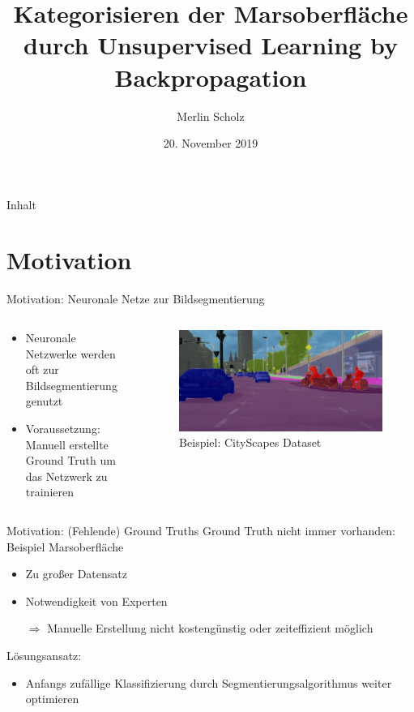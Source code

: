 \documentclass[aspectratio=169]{beamer}
\title[Analyse der Marsoberfläche durch Unsupervised Learning]{Kategorisieren der Marsoberfläche durch Unsupervised Learning by Backpropagation}
\author{Merlin Scholz}
\institute{TU Dortmund}
\date[20.11.2019]{20. November 2019}
\begin{document}
\frame{\titlepage}

\begin{frame}{Inhalt}
	\tableofcontents
\end{frame}

\section{Motivation}

\begin{frame}{Motivation: Neuronale Netze zur Bildsegmentierung}
\begin{columns}
	\begin{column}{.5\textwidth}
		\begin{itemize}
			\item Neuronale Netzwerke werden oft zur Bildsegmentierung genutzt
			\item Voraussetzung: Manuell erstellte Ground Truth um das Netzwerk zu trainieren
			\end{itemize}
	\end{column}
	\begin{column}{.5\textwidth}
		\begin{figure}[H]
			\includegraphics[width=\textwidth,keepaspectratio]{koeln00.png}
			\caption{Beispiel: CityScapes Dataset\cite{Cordts_2016_CVPR}}
		\end{figure}
	\end{column}
\end{columns}


\end{frame}

\begin{frame}{Motivation: (Fehlende) Ground Truths}
Ground Truth nicht immer vorhanden: Beispiel Marsoberfläche
\begin{itemize}
	\item Zu großer Datensatz
	\item Notwendigkeit von Experten
	\item[$\Rightarrow$] Manuelle Erstellung nicht kostengünstig oder zeiteffizient möglich
\end{itemize}
\medskip
Lösungsansatz:
\begin{itemize}
	\item Anfangs zufällige Klassifizierung durch Segmentierungsalgorithmus weiter optimieren
\end{itemize}
\end{frame}
\end{document}
